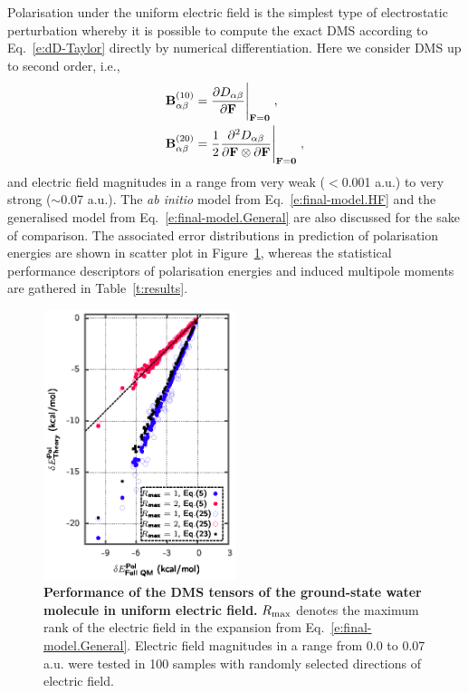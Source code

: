 \documentclass[aip,amsmath,amssymb,reprint,floatfix]{revtex4-1}
\begin{document}
Polarisation under the uniform electric field is the simplest type of electrostatic perturbation
whereby it is possible to compute the exact DMS according to Eq.~\eqref{e:dD-Taylor} 
directly by numerical differentiation. Here we consider DMS up to second order, i.e.,
%
\begin{subequations}\label{e:exact-DMS}
 \begin{align}
  {\bf B}^{(10)}_{\alpha\beta} &= \frac{\partial D_{\alpha\beta}}{\partial {\bf F}}\Bigg|_{{\bf F}={\bf 0}} \;, \label{e:B10} \\
  {\bf B}^{(20)}_{\alpha\beta} &= \frac{1}{2} 
     \frac{\partial^2 D_{\alpha\beta}}{\partial {\bf F} \otimes \partial {\bf F}}\Bigg|_{{\bf F}={\bf 0}} \;, \label{e:B20}
 \end{align}
\end{subequations}
%
and electric field magnitudes in a range from very weak ($<$0.001 a.u.) to very strong ($\sim$0.07 a.u.).
The \emph{ab initio} model from Eq.~\eqref{e:final-model.HF} and
the generalised model from Eq.~\eqref{e:final-model.General} are also discussed for the sake of comparison. 
The associated error distributions in prediction of polarisation energies 
are shown in scatter plot in Figure~\ref{f:fig-1}, whereas the
statistical performance descriptors of polarisation energies and induced multipole moments
are gathered in Table~\ref{t:results}.
%
\begin{figure}[t]
\includegraphics[width=0.5\textwidth]{fig-1.eps}
\caption{\label{f:fig-1} {\bf Performance of the DMS tensors of the ground\hyp{}state water molecule
in uniform electric field.} 
$R_{\rm max}$ denotes the maximum rank of the electric field
in the expansion from Eq.~\eqref{e:final-model.General}.
Electric field magnitudes in a range from 0.0 to 0.07 a.u. were tested in 100 samples with randomly selected 
directions of electric field.
} 
\end{figure}
%
\end{document}
